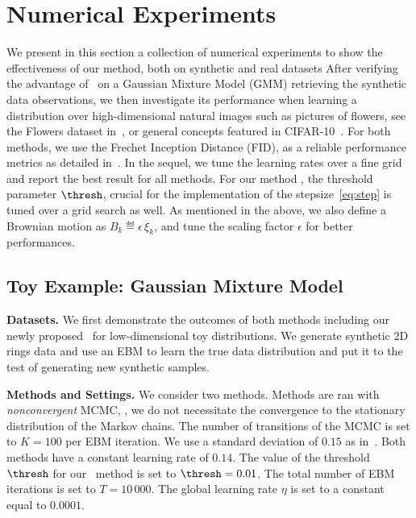 \documentclass{article} %
\begin{document}
\section{Numerical Experiments}\label{sec:numericals}

We present in this section a collection of numerical experiments to show the effectiveness of our method, both on synthetic and real datasets
After verifying the advantage of \algo\ on a Gaussian Mixture Model (GMM) retrieving the synthetic data observations, we then investigate its performance when learning a distribution over high-dimensional natural images such as pictures of flowers, see the Flowers dataset in~\citet{nilsback2008automated}, or general concepts featured in CIFAR-10~\cite{krizhevsky2009learning}.
For both methods, we use the Frechet Inception Distance (FID), as a reliable performance metrics as detailed in~\citet{heusel2017gans}.
In the sequel, we tune the learning rates over a fine grid and report the best result for all methods.
For our method \algo, the threshold parameter $\thresh$, crucial for the implementation of the stepsize~\eqref{eq:step} is tuned over a grid search as well.
As mentioned in the above, we also define a Brownian motion as $B_k \eqdef \epsilon \, \xi_k$, and tune the scaling factor $\epsilon$ for better performances.

\subsection{Toy Example: Gaussian Mixture Model}

\textbf{Datasets.}
We first demonstrate the outcomes of both methods including our newly proposed \algo\ for low-dimensional toy distributions.
We generate synthetic 2D rings data and use an EBM to learn the true data distribution and put it to the test of generating new synthetic samples.

\textbf{Methods and Settings.}
We consider two methods. 
Methods are ran with \emph{nonconvergent} MCMC, \ie, we do not necessitate the convergence to the stationary distribution of the Markov chains.
The number of transitions of the MCMC is set to $K= 100$ per EBM iteration. 
We use a standard deviation of $0.15$ as in~\citet{nijkamp2020anatomy}.
Both methods have a constant learning rate of $0.14$.
The value of the threshold $\thresh$ for our \algo\ method is set to $\thresh = 0.01$.
The total number of EBM iterations is set to $T = 10\,000$.
The global learning rate $\eta$ is set to a constant equal to $0.0001$.
\end{document}
